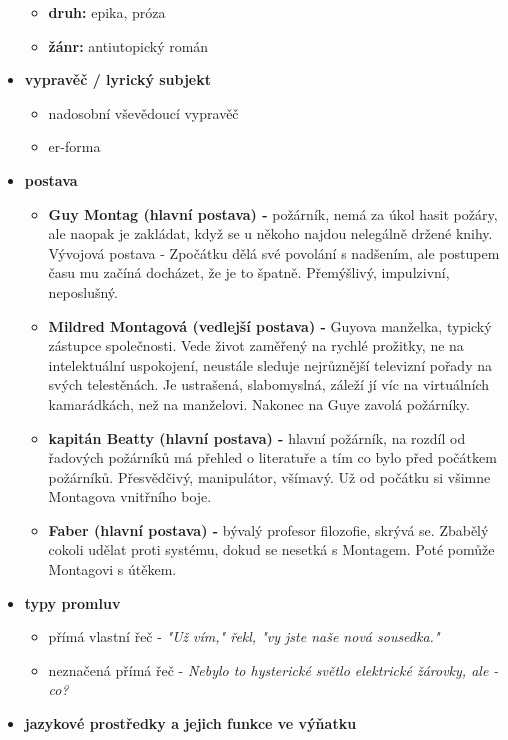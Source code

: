 \documentclass[11pt]{article}
\begin{document}
\begin{itemize}
\begin{itemize}
            \item\textbf{druh:} epika, próza
            \item\textbf{žánr:} antiutopický román
        \end{itemize}
        \item\textbf{vypravěč / lyrický subjekt}
        \begin{itemize}
            \item nadosobní vševědoucí vypravěč
            \item er-forma
        \end{itemize}
        \item\textbf{postava}
        \begin{itemize}
            \item\textbf{Guy Montag (hlavní postava) -} požárník, nemá za úkol hasit požáry, ale naopak je zakládat, když se u někoho najdou nelegálně držené knihy. Vývojová postava - Zpočátku dělá své povolání s nadšením, ale postupem času mu začíná docházet, že je to špatně. Přemýšlivý, impulzivní, neposlušný.
            \item\textbf{Mildred Montagová (vedlejší postava) -} Guyova manželka, typický zástupce společnosti. Vede život zaměřený na rychlé prožitky, ne na intelektuální uspokojení, neustále sleduje nejrůznější televizní pořady na svých telestěnách. Je ustrašená, slabomyslná, záleží jí víc na virtuálních kamarádkách, než na manželovi. Nakonec na Guye zavolá požárníky.
            \item\textbf{kapitán Beatty (hlavní postava) -} hlavní požárník, na rozdíl od řadových požárníků má přehled o literatuře a tím co bylo před počátkem požárníků. Přesvědčivý, manipulátor, všímavý. Už od počátku si všimne Montagova vnitřního boje.
            \item\textbf{Faber (hlavní postava) -} bývalý profesor filozofie, skrývá se. Zbabělý cokoli udělat proti systému, dokud se nesetká s Montagem. Poté pomůže Montagovi s útěkem.
        \end{itemize}
        \item\textbf{typy promluv}
        \begin{itemize}
            \item přímá vlastní řeč - \textit{"Už vím," řekl, "vy jste naše nová sousedka."}
            \item neznačená přímá řeč - \textit{Nebylo to hysterické světlo elektrické žárovky, ale - co?}
        \end{itemize}
        \item\textbf{jazykové prostředky a jejich funkce ve výňatku}

\end{itemize}
\end{document}
